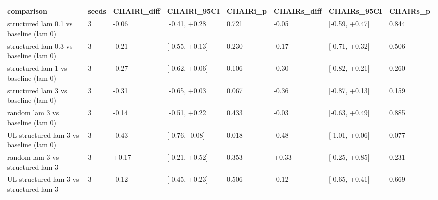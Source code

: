 \begin{tabular}{llllllll}
\hline
comparison & seeds & CHAIRi\_diff & CHAIRi\_95CI & CHAIRi\_p & CHAIRs\_diff & CHAIRs\_95CI & CHAIRs\_p \\
\hline
structured lam 0.1 vs baseline (lam 0) & 3 & -0.06 & [-0.41, +0.28] & 0.721 & -0.05 & [-0.59, +0.47] & 0.844 \\
structured lam 0.3 vs baseline (lam 0) & 3 & -0.21 & [-0.55, +0.13] & 0.230 & -0.17 & [-0.71, +0.32] & 0.506 \\
structured lam 1 vs baseline (lam 0) & 3 & -0.27 & [-0.62, +0.06] & 0.106 & -0.30 & [-0.82, +0.21] & 0.260 \\
structured lam 3 vs baseline (lam 0) & 3 & -0.31 & [-0.65, +0.03] & 0.067 & -0.36 & [-0.87, +0.13] & 0.159 \\
random lam 3 vs baseline (lam 0) & 3 & -0.14 & [-0.51, +0.22] & 0.433 & -0.03 & [-0.63, +0.49] & 0.885 \\
UL structured lam 3 vs baseline (lam 0) & 3 & -0.43 & [-0.76, -0.08] & 0.018 & -0.48 & [-1.01, +0.06] & 0.077 \\
random lam 3 vs structured lam 3 & 3 & +0.17 & [-0.21, +0.52] & 0.353 & +0.33 & [-0.25, +0.85] & 0.231 \\
UL structured lam 3 vs structured lam 3 & 3 & -0.12 & [-0.45, +0.23] & 0.506 & -0.12 & [-0.65, +0.41] & 0.669 \\
\hline
\end{tabular}

